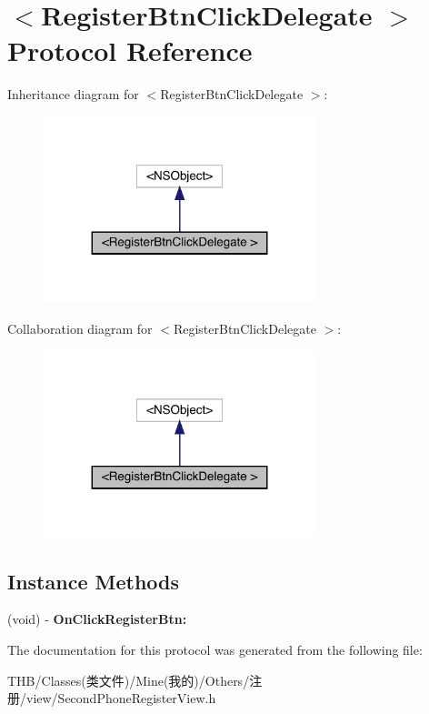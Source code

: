 \hypertarget{protocol_register_btn_click_delegate_01-p}{}\section{$<$Register\+Btn\+Click\+Delegate $>$ Protocol Reference}
\label{protocol_register_btn_click_delegate_01-p}


Inheritance diagram for $<$Register\+Btn\+Click\+Delegate $>$\+:\nopagebreak
\begin{figure}[H]
\begin{center}
\leavevmode
\includegraphics[width=224pt]{protocol_register_btn_click_delegate_01-p__inherit__graph}
\end{center}
\end{figure}


Collaboration diagram for $<$Register\+Btn\+Click\+Delegate $>$\+:\nopagebreak
\begin{figure}[H]
\begin{center}
\leavevmode
\includegraphics[width=224pt]{protocol_register_btn_click_delegate_01-p__coll__graph}
\end{center}
\end{figure}
\subsection*{Instance Methods}
\begin{DoxyCompactItemize}
\item 
\mbox{\label{protocol_register_btn_click_delegate_01-p_ace696efb48b5b68c10183273218a5108}} 
(void) -\/ {\bfseries On\+Click\+Register\+Btn\+:}
\end{DoxyCompactItemize}


The documentation for this protocol was generated from the following file\+:\begin{DoxyCompactItemize}
\item 
T\+H\+B/\+Classes(类文件)/\+Mine(我的)/\+Others/注册/view/Second\+Phone\+Register\+View.\+h\end{DoxyCompactItemize}
